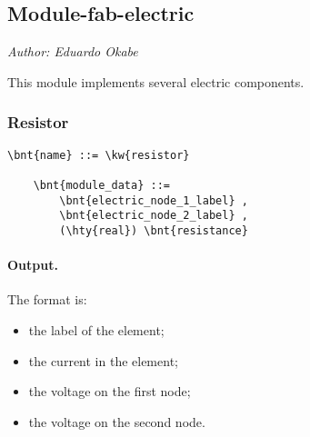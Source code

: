 % 
% 
% 
% 
% 
% 
% 
% 
% 


\subsection{Module-fab-electric}
\label{sec:MODULE:FAB-ELECTRIC}
\emph{Author: Eduardo Okabe}

\noindent
This module implements several electric components.

\subsubsection{Resistor}
\label{sec:MODULE:FAB-ELECTRIC:RESISTOR}
\begin{Verbatim}[commandchars=\\\{\}]
    \bnt{name} ::= \kw{resistor}

    \bnt{module_data} ::=
        \bnt{electric_node_1_label} ,
        \bnt{electric_node_2_label} ,
        (\hty{real}) \bnt{resistance}
\end{Verbatim}

\paragraph{Output.}
\label{sec:MODULE:FAB-ELECTRIC:RESISTOR:OUTPUT}
The format is:
\begin{itemize}
\item the label of the element;
\item the current in the element;
\item the voltage on the first node;
\item the voltage on the second node.
\end{itemize}

